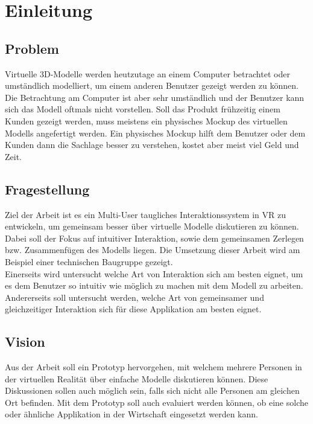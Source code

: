 \chapter{Einleitung}
\label{ch:Einleitung}

\section{Problem}

Virtuelle 3D-Modelle werden heutzutage an einem Computer betrachtet oder umständlich modelliert, um einem anderen Benutzer gezeigt werden zu können. Die Betrachtung am Computer ist aber sehr umständlich und der Benutzer kann sich das Modell oftmals nicht vorstellen. Soll das Produkt frühzeitig einem Kunden gezeigt werden, muss meistens ein physisches Mockup des virtuellen Modells angefertigt werden. Ein physisches Mockup hilft dem Benutzer oder dem Kunden dann die Sachlage besser zu verstehen, kostet aber meist viel Geld und Zeit.

\section{Fragestellung}

Ziel der Arbeit ist es ein Multi-User taugliches Interaktionssystem in VR zu entwickeln, um gemeinsam besser über virtuelle Modelle diskutieren zu können. Dabei soll der Fokus auf intuitiver Interaktion, sowie dem gemeinsamen Zerlegen bzw. Zusammenfügen des Modells liegen. Die Umsetzung dieser Arbeit wird am Beispiel einer technischen Baugruppe gezeigt. \\

\noindent Einerseits wird untersucht welche Art von Interaktion sich am besten eignet, um es dem Benutzer so intuitiv wie möglich zu machen mit dem Modell zu arbeiten. Andererseits soll untersucht werden, welche Art von gemeinsamer und gleichzeitiger Interaktion sich für diese Applikation am besten eignet.

\section{Vision}

Aus der Arbeit soll ein Prototyp hervorgehen, mit welchem mehrere Personen in der virtuellen Realität über einfache Modelle diskutieren können. Diese Diskussionen sollen auch möglich sein, falls sich nicht alle Personen am gleichen Ort befinden.
Mit dem Prototyp soll auch evaluiert werden können, ob eine solche oder ähnliche Applikation in der Wirtschaft eingesetzt werden kann. 